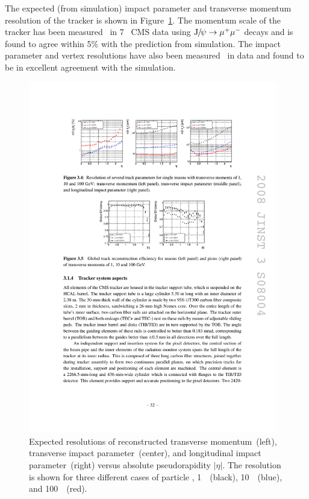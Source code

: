 The expected (from simulation) impact parameter and transverse momentum
resolution of the tracker is shown in Figure~\ref{fig:ExpectedTrackerRes}.  The
momentum scale of the tracker has been measured~\cite{CMS-PAS-TRK-10-004} in
7~ CMS data using $\mathrm{J}\hspace{-.08em}/\hspace{-.14em}\psi \to \mu^+\mu^-$ decays and is found to agree within
5\% with the prediction from simulation.  The impact parameter and vertex
resolutions have also been measured~\cite{CMS-PAS-TRK-10-005} in data and found
to be in excellent agreement with the simulation.
\begin{figure}
  \centering
  \includegraphics[width=0.97\textwidth]{detector_chapter/figures/predicted_momentum_resolution.pdf}
  \caption[Momentum and impact parameter resolutions of CMS tracker]{Expected
  resolutions of reconstructed transverse momentum~(left), transverse impact
  parameter~(center), and longitudinal impact parameter~(right) versus absolute
  pseudorapidity $|\eta|$. The resolution is shown for three different cases of
  particle \pt, 1~\GeVc~(black), 10~\GeVc~(blue), and 100~\GeVc~(red).}
  \label{fig:ExpectedTrackerRes}
\end{figure}

